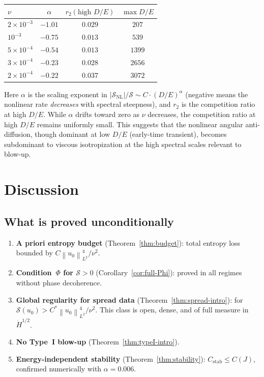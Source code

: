 \documentclass[11pt]{article}
\theoremstyle{definition}
\newcommand{\norm}[1]{\left\| #1 \right\|}
\newcommand{\Hdot}[1]{\dot{H}^{#1}}
\newcommand{\cS}{\mathcal{S}}
\begin{document}
\begin{center}
\begin{tabular}{lccc}
\toprule
$\nu$ & $\alpha$ & $r_2(\text{high } D/E)$ & $\max D/E$ \\
\midrule
$2\times10^{-3}$ & $-1.01$ & $0.029$ & $207$ \\
$10^{-3}$ & $-0.75$ & $0.013$ & $539$ \\
$5\times10^{-4}$ & $-0.54$ & $0.013$ & $1399$ \\
$3\times10^{-4}$ & $-0.23$ & $0.028$ & $2656$ \\
$2\times10^{-4}$ & $-0.22$ & $0.037$ & $3072$ \\
\bottomrule
\end{tabular}
\end{center}

Here $\alpha$ is the scaling exponent in
$|\cS_{\mathrm{NL}}|/\cS \sim C\cdot(D/E)^\alpha$
(negative means the nonlinear rate \emph{decreases} with
spectral steepness), and $r_2$ is the competition ratio
at high $D/E$.  While $\alpha$ drifts toward zero as
$\nu$ decreases, the competition ratio at high $D/E$
remains uniformly small.  This suggests that the
nonlinear angular anti-diffusion, though dominant at low
$D/E$ (early-time transient), becomes subdominant to
viscous isotropization at the high spectral scales
relevant to blow-up.


\section{Discussion}\label{sec:discussion}

\subsection{What is proved unconditionally}

\begin{enumerate}[label=(\roman*)]
\item \textbf{A priori entropy budget}
(Theorem~\ref{thm:budget}): total entropy loss bounded
by $C\norm{u_0}_{L^2}^4/\nu^2$.
\item \textbf{Condition~$\Phi$ for $\cS > 0$}
(Corollary~\ref{cor:full-Phi}): proved in all regimes
without phase decoherence.
\item \textbf{Global regularity for spread data}
(Theorem~\ref{thm:spread-intro}): for
$\cS(u_0) > C^*\norm{u_0}_{L^2}^4/\nu^2$.
This class is open, dense, and of full measure in
$\Hdot{1/2}$.
\item \textbf{No Type~I blow-up}
(Theorem~\ref{thm:typeI-intro}).
\item \textbf{Energy-independent stability}
(Theorem~\ref{thm:stability}): $C_{\mathrm{stab}} \leq C(J)$,
confirmed numerically with $\alpha = 0.006$.
\end{enumerate}
\end{document}
